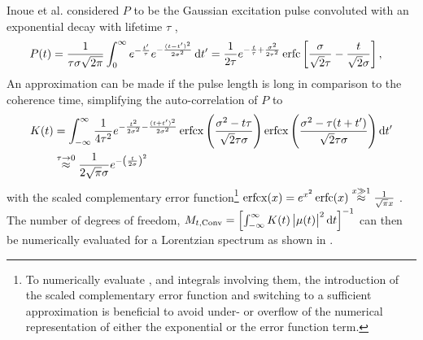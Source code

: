 Inoue et al. considered $P$ to be the Gaussian excitation pulse convoluted with an exponential decay with lifetime $\tau$ \cite{inoue2019,butz2015},
\begin{align}
P(t)&=\frac{1}{\tau\sigma\sqrt{2\pi}} \int_0^{\infty} e^{-\frac{t^{\prime}}{\tau}} 
e^{-\frac{(t-t^{\prime})^2}{2\sigma^2}}\operatorname{\mathrm{d}\!} t^{\prime}
=\frac{1}{2\tau}e^{-\frac{t}{\tau}+\frac{\sigma^2}{2\tau^2}}
\operatorname{erfc}\left[
\frac{\sigma}{\sqrt{2}\tau}
-\frac{t}{\sqrt{2}\sigma}
	\right] ,
	\label{eq:pfull}
	\end{align}
	An approximation can be made if the pulse length is long in comparison to the coherence time, simplifying the auto-correlation of $P$ to
\begin{align}
K(t)&=\int_{-\infty}^\infty \frac{1}{4
	\tau ^2}e^{-\frac{t^2}{2 \sigma ^2}-\frac{(t+t')^2}{2 \sigma ^2}}
\operatorname{erfcx}\left(\frac{\sigma^2 -t \tau }{\sqrt{2} \tau \sigma}\right)
\operatorname{erfcx}\left(\frac{\sigma^2 -\tau  (t+t')}{\sqrt{2} \tau \sigma }\right) \operatorname{\mathrm{d}\!} t' \nonumber \\
&\stackrel{\tau \rightarrow 0}{\approx} \frac{1}{2\sqrt{\pi}\sigma} e^{-\left(\frac{t}{2\sigma}\right)^2} 
\label{eq:kapprox}
\end{align}
with the scaled complementary error function\footnote{To numerically evaluate ,  and integrals involving them, the introduction of the scaled complementary error function and switching to a sufficient approximation is beneficial to avoid under- or overflow of the numerical representation of either the exponential or the error function term.} $\operatorname{erfcx}(x)=e^{x^2}\operatorname{erfc}(x)\stackrel{x\gg1}{\approx}  \frac{1}{\sqrt{\pi}x}$
   \cite{ren2007}.
The number of degrees of freedom, $M_{t,\text{Conv}}=\left[\int_{-\infty}^{\infty} K(t) \left|\mu(t)\right|^2\operatorname{\mathrm{d}\!} t\right]^{-1}$  can then be numerically evaluated  for a Lorentzian spectrum as shown in .

